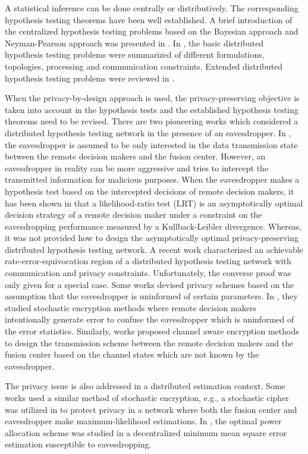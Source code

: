 \documentclass[g5paper,phd,electronic]{kthesis}
\numberwithin{theorem}{chapter}
\numberwithin{lemma}{chapter}
\numberwithin{proposition}{chapter}
\numberwithin{corollary}{chapter}
\numberwithin{remark}{chapter}
\numberwithin{property}{chapter}
\numberwithin{conjecture}{chapter}
\numberwithin{assumption}{chapter}
\numberwithin{algorithm}{chapter}
\begin{document}
A statistical inference can be done centrally or distributively. The corresponding hypothesis testing theorems have been well established. A brief introduction of the centralized hypothesis testing problems based on the Bayesian approach and Neyman-Pearson approach was presented in \cite{trees2001}. In \cite{varshney1996,tsitsiklis1993}, the basic distributed hypothesis testing problems were summarized of different formulations, topologies, processing and communication constraints. Extended distributed hypothesis testing problems were reviewed in \cite{blum1997}.

When the privacy-by-design approach is used, the privacy-preserving objective is taken into account in the hypothesis tests and the established hypothesis testing theorems need to be revised. There are two pioneering works \cite{marano2009,nadendla2010} which considered a distributed hypothesis testing network in the presence of an eavesdropper. In \cite{marano2009}, the eavesdropper is assumed to be only interested in the data transmission state between the remote decision makers and the fusion center. However, an eavesdropper in reality can be more aggressive and tries to intercept the transmitted information for malicious purposes. When the eavesdropper makes a hypothesis test based on the intercepted decisions of remote decision makers, it has been shown in \cite{nadendla2010} that a likelihood-ratio test (LRT) is an asymptotically optimal decision strategy of a remote decision maker under a constraint on the eavesdropping performance measured by a Kullback-Leibler divergence. Whereas, it was not provided how to design the asymptotically optimal privacy-preserving distributed hypothesis testing network. A recent work \cite{mhanna2015} characterized an achievable rate-error-equivocation region of a distributed hypothesis testing network with communication and privacy constraints. Unfortunately, the converse proof was only given for a special case. Some works devised privacy schemes based on the assumption that the eavesdropper is uninformed of certain parameters. In \cite{nadendla2009,soosahabi2014}, they studied stochastic encryption methods where remote decision makers intentionally generate error to confuse the eavesdropper which is uninformed of the error statistics. Similarly, works \cite{jeon2011,jeon2013} proposed channel aware encryption methods to design the transmission scheme between the remote decision makers and the fusion center based on the channel states which are not known by the eavesdropper.

The privacy issue is also addressed in a distributed estimation context. Some works used a similar method of stochastic encryption, e.g., a stochastic cipher was utilized in \cite{aysal2008} to protect privacy in a network where both the fusion center and eavesdropper make maximum-likelihood estimations. In \cite{guo2017}, the optimal power allocation scheme was studied in a decentralized minimum mean square error estimation susceptible to eavesdropping.
\end{document}
